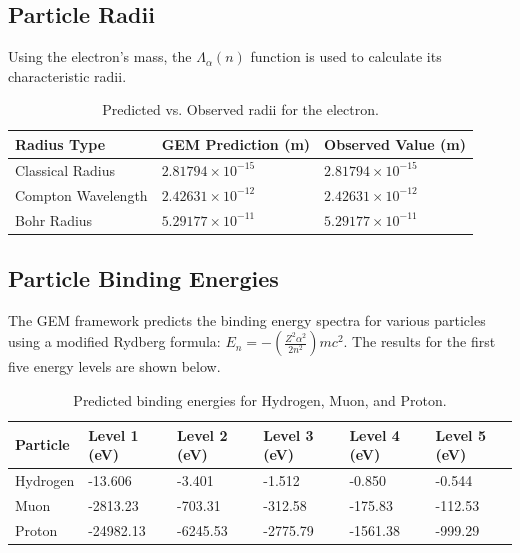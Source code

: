 \documentclass[12pt]{article}
\begin{document}
\subsection{Particle Radii}

Using the electron's mass, the $\Lambda_\alpha(n)$ function is used to calculate its characteristic radii.

\begin{table}[h!]
\centering
\begin{tabular}{|l|l|l|}
\hline
\textbf{Radius Type} & \textbf{GEM Prediction (m)} & \textbf{Observed Value (m)} \\
\hline
Classical Radius & $2.81794 \times 10^{-15}$ & $2.81794 \times 10^{-15}$ \\
Compton Wavelength & $2.42631 \times 10^{-12}$ & $2.42631 \times 10^{-12}$ \\
Bohr Radius & $5.29177 \times 10^{-11}$ & $5.29177 \times 10^{-11}$ \\
\hline
\end{tabular}
\caption{Predicted vs. Observed radii for the electron.}
\label{tab:radii}
\end{table}

\subsection{Particle Binding Energies}

The GEM framework predicts the binding energy spectra for various particles using a modified Rydberg formula: $E_n = -\left(\frac{Z^2 \alpha^2}{2n^2}\right) m c^2$. The results for the first five energy levels are shown below.

\begin{table}[h!]
\centering
\begin{tabular}{|l|l|l|l|l|l|}
\hline
\textbf{Particle} & \textbf{Level 1 (eV)} & \textbf{Level 2 (eV)} & \textbf{Level 3 (eV)} & \textbf{Level 4 (eV)} & \textbf{Level 5 (eV)} \\
\hline
Hydrogen & -13.606 & -3.401 & -1.512 & -0.850 & -0.544 \\
Muon & -2813.23 & -703.31 & -312.58 & -175.83 & -112.53 \\
Proton & -24982.13 & -6245.53 & -2775.79 & -1561.38 & -999.29 \\
\hline
\end{tabular}
\caption{Predicted binding energies for Hydrogen, Muon, and Proton.}
\label{tab:binding}
\end{table}
\end{document}
